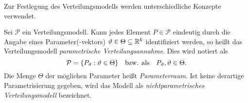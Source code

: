 \documentclass{lecture}
\begin{document}
    Zur Festlegung des Verteilungsmodells werden unterschiedliche Konzepte verwendet.

    \begin{definition}
        Sei \(\mathcal{P}\) ein Verteilungsmodell.
        Kann jedes Element \(P \in \mathcal{P}\) eindeutig durch die Angabe eines Parameter(-vektors) \(\vartheta \in \Theta \subseteq \mathbb{R}^k\) identifiziert werden, so heißt das Verteilungsmodell \emph{parametrische Verteilungsannahme}.
        Dies wird notiert als
        \[
            \mathcal{P} = \braces*{P_\vartheta : \vartheta \in \Theta} \quad \text{bzw. als} \quad P_\vartheta, \vartheta \in \Theta.
        \]
        Die Menge \(\Theta\) der möglichen Parameter heißt \emph{Parameterraum}.
        Ist keine derartige Parametrisierung gegeben, wird das Modell als \emph{nichtparametrisches Verteilungsmodell} bezeichnet.
    \end{definition}
\end{document}

